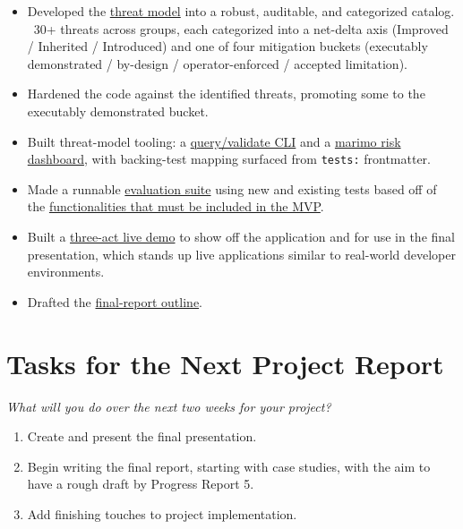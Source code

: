 \documentclass[12pt]{article}
\newcommand{\PRNumber}{4}
\newcommand{\RepoURL}{https://github.com/Ian-Costa18/Cybersecurity-Practicum/blob/progress-report-\PRNumber}
\newcommand{\instruction}[1]{{\small\itshape #1}}
\begin{document}
\begin{itemize}[leftmargin=1.5em, itemsep=2pt]
  \item Developed the \href{\RepoURL/docs/threat-model}{threat model} into a robust, auditable, and categorized catalog. ~30+ threats across groups, each categorized into a net-delta axis (Improved / Inherited / Introduced) and one of four mitigation buckets (executably demonstrated / by-design / operator-enforced / accepted limitation).
  \item Hardened the code against the identified threats, promoting some to the executably demonstrated bucket.
  \item Built threat-model tooling: a \href{\RepoURL/tools/threat_model.py}{query/validate CLI} and a \href{\RepoURL/docs/threat-model/threat_model_dashboard.py}{marimo risk dashboard}, with backing-test mapping surfaced from \texttt{tests:} frontmatter.
  \item Made a runnable \href{\RepoURL/tools/evidence.py}{evaluation suite} using new and existing tests based off of the \href{\RepoURL/docs/mvp-prd.md}{functionalities that must be included in the MVP}.
  \item Built a \href{\RepoURL/demo/notebooks/publish_demo.py}{three-act live demo} to show off the application and for use in the final presentation, which stands up live applications similar to real-world developer environments.
  \item Drafted the \href{\RepoURL/Practicum\%20Work/Final\%20Report/outline.md}{final-report outline}.
\end{itemize}

\section*{Tasks for the Next Project Report}

\instruction{What will you do over the next two weeks for your project?}

\begin{enumerate}[leftmargin=1.5em, itemsep=2pt]
  \item Create and present the final presentation.
  \item Begin writing the final report, starting with case studies, with the aim to have a rough draft by Progress Report 5.
  \item Add finishing touches to project implementation.
\end{enumerate}
\end{document}
